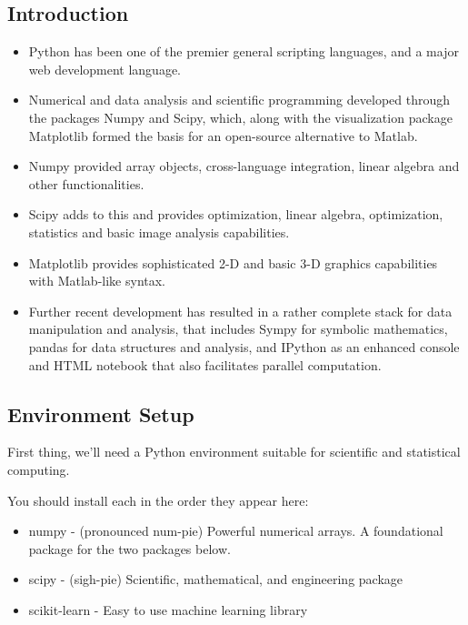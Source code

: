 \documentclass[11pt]{article} %
\begin{document}
\subsection*{Introduction}

\begin{itemize}
\item Python has been one of the premier general scripting languages, and a major web development language. 

\item Numerical and data analysis and scientific programming developed through the packages Numpy and Scipy, 
which, along with the visualization package Matplotlib formed the basis for an open-source alternative to Matlab. 

\item Numpy provided array objects, cross-language integration, linear algebra and other functionalities. 

\item Scipy adds to this and provides optimization, linear algebra, optimization, statistics and basic image analysis 
capabilities. 

\item Matplotlib provides sophisticated 2-D and basic 3-D graphics capabilities with Matlab-like syntax.


\item Further recent development has resulted in a rather complete stack for data manipulation and analysis, that includes Sympy for symbolic mathematics, pandas for data structures and analysis, and IPython as an enhanced console and HTML notebook that also facilitates parallel computation.
\end{itemize}


\newpage
\subsection*{Environment Setup}

First thing, we'll need a Python environment suitable for scientific and statistical computing. 

You should install each in the order they appear here:

\begin{itemize}
\item numpy - (pronounced num-pie) Powerful numerical arrays. A foundational package for the two packages below.
\item scipy - (sigh-pie) Scientific, mathematical, and engineering package
\item scikit-learn - Easy to use machine learning library
\end{itemize}
\end{document}
